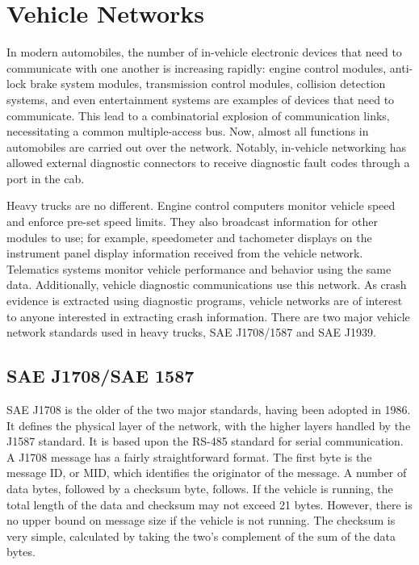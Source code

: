 \documentclass{report}
\begin{document}
\section{Vehicle Networks}

In modern automobiles, the number of in-vehicle electronic devices that need to communicate with one another is increasing rapidly:
engine control modules, anti-lock brake system modules, transmission control modules, collision detection systems, and even entertainment systems are examples of
devices that need to communicate. This lead to a combinatorial explosion of communication links, necessitating a common multiple-access
bus. Now, almost all functions in automobiles are carried out over the network. Notably, in-vehicle networking has allowed external diagnostic
connectors to receive diagnostic fault codes through a port in the cab.

Heavy trucks are no different. Engine control computers monitor vehicle speed and enforce pre-set speed limits. They also broadcast information
for other modules to use; for example, speedometer and tachometer displays on the instrument panel display information received from the vehicle
network. Telematics systems monitor vehicle performance and behavior using the same data. Additionally, vehicle diagnostic communications use
this network. As crash evidence is extracted using diagnostic programs, vehicle networks are of interest to anyone interested in extracting
crash information. There are two major vehicle network standards used in heavy trucks, SAE J1708/1587\cite{J1708}\cite{J1587} and SAE J1939\cite{J1939-71}.

\subsection{SAE J1708/SAE 1587}

SAE J1708 is the older of the two major standards, having been adopted in 1986. It defines the physical layer of the network,
with the higher layers handled by the J1587 standard. It is based upon the RS-485 standard for serial communication. A J1708 message
has a fairly straightforward format. The first byte is the message ID, or MID, which identifies the originator of the message. A
number of data bytes, followed by a checksum byte, follows. If the vehicle is running, the total length of the data and checksum
may not exceed 21 bytes.\cite{J1708} However, there is no upper bound on message size if the vehicle is not running. The checksum is very simple,
calculated by taking the two's complement of the sum of the data bytes.
\end{document}

